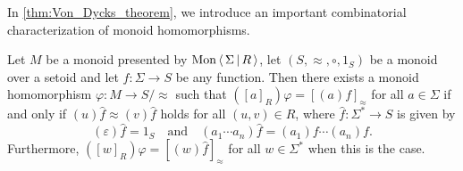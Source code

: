 In \cref{thm:Von_Dycks_theorem}, we introduce an important combinatorial characterization of
monoid homomorphisms.

\begin{theorem}%
  \label{thm:Von_Dycks_theorem}
  \rocqok{}
  Let $M$ be a monoid presented by $\textrm{Mon}\left\langle\, \Sigma \,\middle|\, R \,\right\rangle$, let
  $(S, \approx, \circ, 1_S)$ be a monoid over a setoid and let
  $f: \Sigma \rightarrow S$ be any function. Then there exists a
  monoid homomorphism $\varphi: M \rightarrow S/{\approx}$ such that
  $({[a]}_{R})\varphi = {[(a)f]}_{\approx}$ for all $a \in \Sigma$ if and only if
  $(u)\widehat{f} \approx (v)\widehat{f}$ holds for all $(u, v) \in R$, where
  $\widehat{f} : \Sigma^\ast \rightarrow S$ is given by
  \[
    (\varepsilon)\widehat{f} =  1_S \quad\text{and}\quad (a_1\cdots a_n)\widehat{f} = (a_1)f\cdots (a_n)f.
  \]
  Furthermore, $({[w]}_{R})\varphi = {\left[(w)\widehat{f}\right]}_{\approx}$ for all $w\in \Sigma^\ast$ when this
  is the case.
\end{theorem}
